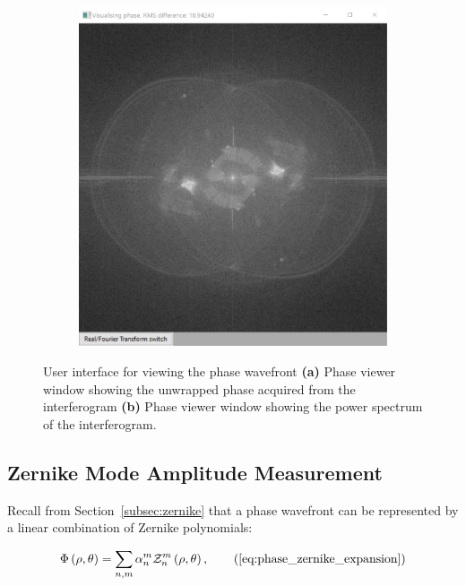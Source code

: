 \begin{figure}[h]
\begin{subfigure}{0.45\textwidth}
		\includegraphics[width=1\linewidth, scale=0.5]{images/phase_viewer_ft.jpg}
		\caption{}
		\label{fig:phase_viewer_ft}
	\end{subfigure}
	\caption[User interface for viewing the phase wavefront]{User interface for viewing the phase wavefront \textbf{(a)} Phase viewer window showing the unwrapped phase acquired from the interferogram \textbf{(b)} Phase viewer window showing the power spectrum of the interferogram. }
	\label{fig:phase_viewer}
\end{figure}

\subsection{Zernike Mode Amplitude Measurement}
\label{subsec:zernike_mode_measurment}

Recall from Section~\ref{subsec:zernike} that a phase wavefront can be represented by a linear combination of Zernike polynomials:

\begin{equation}
\Phi\left(\rho,\theta\right) = \sum\limits_{n,m}\alpha^{m}_{n}\mathcal{Z}^{m}_{n}\left(\rho,\theta\right),\tag{\ref{eq:phase_zernike_expansion}}
\end{equation}

